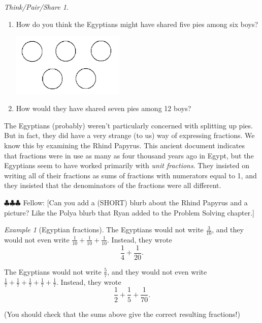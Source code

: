 \documentclass[10pt, reqno]{amsart}
\theoremstyle{remark}
\newtheorem{example}[thm]{Example}
\newtheorem*{thinkpair*}{Think/Pair/Share}
\theoremstyle{definition}
\numberwithin{equation}{section}  %
\newcommand{\fellow}[1]{{\color{magenta} \sf $\clubsuit\clubsuit\clubsuit$ Fellow: [#1]}}
\begin{document}
\begin{thinkpair*}\ 
\begin{enumerate}
\item
How do you think the Egyptians might have shared five pies among six boys?
\begin{center}
\includegraphics[height=3cm]{fivepies}
\end{center}

\item
How would they have shared seven pies among 12 boys?

\end{enumerate}

\end{thinkpair*}

The Egyptians (probably) weren't particularly concerned with splitting up pies.  But in fact, they did have a very strange (to us) way of expressing fractions. We know this by examining the  Rhind Papyrus.  This ancient document indicates that fractions were in use as many as four thousand years ago in Egypt, but the Egyptians seem to have worked primarily with \emph{unit fractions}.  They insisted on writing all of their fractions as sums of fractions with
numerators equal to 1, and they insisted that  the denominators of the fractions were all different.

\fellow{Can you add a (SHORT) blurb about the Rhind Papyrus and a picture?  Like the Polya blurb that Ryan added to the Problem Solving chapter.}

\begin{example}[Egyptian fractions]
The Egyptians would not write $\frac 3{10}$, and they would not even write $\frac 1{10} + \frac 1{10} + \frac 1{10}$.  Instead, they wrote 
\[
\frac 1 4 + \frac 1{20}.
\]


The Egyptians would not write $\frac 5{7}$, and they would not even write $\frac 1{7} + \frac 1{7} + \frac 1{7} + \frac 1{7} + \frac 1{7}$.  Instead, they wrote 
\[
\frac 1 2 + \frac 1 5 + \frac 1{70}.
\]

(You should check that the sums above give the correct resulting fractions!)
\end{example}
\end{document}
